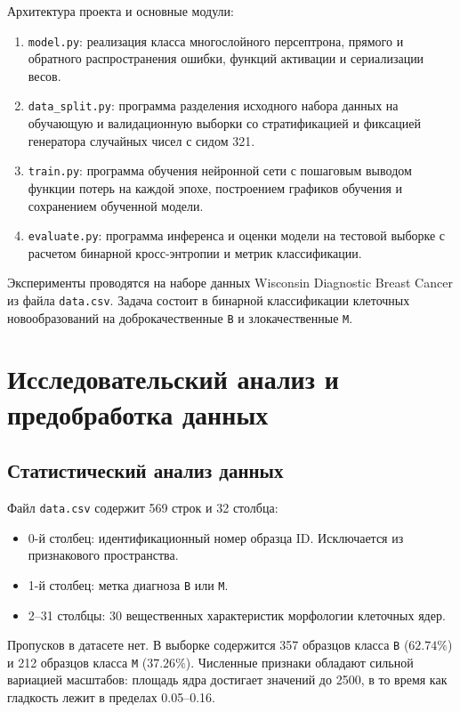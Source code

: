\documentclass[a4paper,14pt]{extarticle}
\begin{document}
Архитектура проекта и основные модули:
\begin{enumerate}
    \item \texttt{model.py}: реализация класса многослойного персептрона, прямого и обратного распространения ошибки, функций активации и сериализации весов.
    \item \texttt{data\_split.py}: программа разделения исходного набора данных на обучающую и валидационную выборки со стратификацией и фиксацией генератора случайных чисел с сидом 321.
    \item \texttt{train.py}: программа обучения нейронной сети с пошаговым выводом функции потерь на каждой эпохе, построением графиков обучения и сохранением обученной модели.
    \item \texttt{evaluate.py}: программа инференса и оценки модели на тестовой выборке с расчетом бинарной кросс-энтропии и метрик классификации.
\end{enumerate}

Эксперименты проводятся на наборе данных Wisconsin Diagnostic Breast Cancer из файла \texttt{data.csv}. Задача состоит в бинарной классификации клеточных новообразований на доброкачественные \texttt{B} и злокачественные \texttt{M}.

\section{Исследовательский анализ и предобработка данных}

\subsection{Статистический анализ данных}

Файл \texttt{data.csv} содержит 569 строк и 32 столбца:
\begin{itemize}
    \item 0-й столбец: идентификационный номер образца ID. Исключается из признакового пространства.
    \item 1-й столбец: метка диагноза \texttt{B} или \texttt{M}.
    \item 2--31 столбцы: 30 вещественных характеристик морфологии клеточных ядер.
\end{itemize}

Пропусков в датасете нет. В выборке содержится 357 образцов класса \texttt{B} ($62.74\%$) и 212 образцов класса \texttt{M} ($37.26\%$). Численные признаки обладают сильной вариацией масштабов: площадь ядра достигает значений до 2500, в то время как гладкость лежит в пределах 0.05--0.16.
\end{document}
